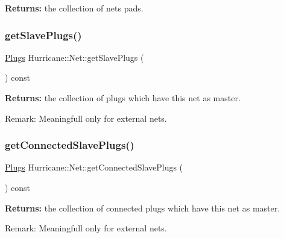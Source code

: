 {\bfseries Returns\+:} the collection of net\textquotesingle{}s pads. \mbox{\label{classHurricane_1_1Net_a9c835d2f071155521700921d816ac1fa}} 
\subsubsection{\texorpdfstring{get\+Slave\+Plugs()}{getSlavePlugs()}}
{\footnotesize\ttfamily \mbox{\hyperlink{namespaceHurricane_ac8335d2057483ee7a935c15a9460c64f}{Plugs}} Hurricane\+::\+Net\+::get\+Slave\+Plugs (\begin{DoxyParamCaption}{ }\end{DoxyParamCaption}) const}

{\bfseries Returns\+:} the collection of plugs which have this net as master.

\begin{DoxyParagraph}{Remark\+: Meaningfull only for external nets. }

\end{DoxyParagraph}
\mbox{\label{classHurricane_1_1Net_a08560ffa6b0f5ecc442bf232486dd8ff}} 
\subsubsection{\texorpdfstring{get\+Connected\+Slave\+Plugs()}{getConnectedSlavePlugs()}}
{\footnotesize\ttfamily \mbox{\hyperlink{namespaceHurricane_ac8335d2057483ee7a935c15a9460c64f}{Plugs}} Hurricane\+::\+Net\+::get\+Connected\+Slave\+Plugs (\begin{DoxyParamCaption}{ }\end{DoxyParamCaption}) const}

{\bfseries Returns\+:} the collection of connected plugs which have this net as master.

\begin{DoxyParagraph}{Remark\+: Meaningfull only for external nets. }

\end{DoxyParagraph}
\mbox{\label{classHurricane_1_1Net_aad3f3ea88bdea914cab3f38bdcdb843d}} 
